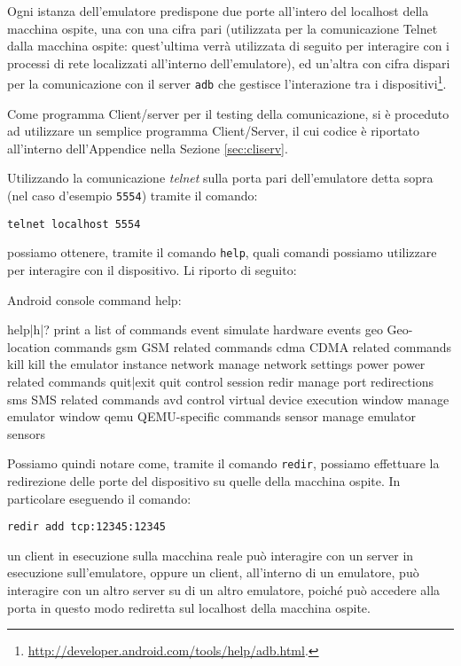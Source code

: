 
Ogni istanza dell'emulatore predispone due porte all'intero del localhost della
macchina ospite, una con una cifra pari (utilizzata per la comunicazione Telnet
dalla macchina ospite: quest'ultima verrà utilizzata di seguito per interagire
con i processi di rete localizzati all'interno dell'emulatore), ed un'altra con 
cifra dispari per la comunicazione con il server \texttt{\small adb} che gestisce 
l'interazione tra i dispositivi\footnote{\url{http://developer.android.com/tools/help/adb.html}.}.

Come programma Client/server per il testing della comunicazione, si è proceduto
ad utilizzare un semplice programma Client/Server, il cui codice è riportato 
all'interno dell'Appendice nella Sezione \vref{sec:cliserv}.

Utilizzando la comunicazione \textit{telnet} sulla porta pari dell'emulatore detta 
sopra (nel caso d'esempio \texttt{\small 5554}) tramite il comando:
\begin{center}
\texttt{\small telnet localhost 5554}
\end{center}
possiamo ottenere, tramite il comando \texttt{\small help}, quali comandi possiamo 
utilizzare per interagire con il dispositivo. Li riporto di seguito:
\begin{bash}
Android console command help:

    help|h|?         print a list of commands
    event            simulate hardware events
    geo              Geo-location commands
    gsm              GSM related commands
    cdma             CDMA related commands
    kill             kill the emulator instance
    network          manage network settings
    power            power related commands
    quit|exit        quit control session
    redir            manage port redirections
    sms              SMS related commands
    avd              control virtual device execution
    window           manage emulator window
    qemu             QEMU-specific commands
    sensor           manage emulator sensors
\end{bash}
Possiamo quindi notare come, tramite il comando \texttt{\small redir}, possiamo
effettuare la redirezione delle porte del dispositivo su quelle della macchina
ospite. In particolare eseguendo il comando:
\begin{center}
\texttt{\small redir add tcp:12345:12345}
\end{center}
un client in esecuzione sulla macchina reale può interagire con
un server in esecuzione sull'emulatore, oppure un client, all'interno di un
emulatore, può interagire con un altro server su di un altro emulatore, poiché può accedere
alla porta in questo modo rediretta sul localhost della macchina ospite.


